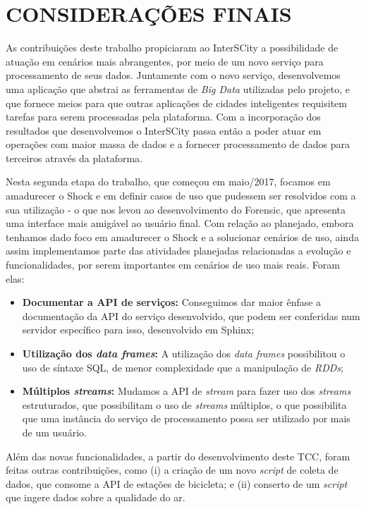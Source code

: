 \chapter{CONSIDERAÇÕES FINAIS}
\label{chapter:final}

As contribuições deste trabalho propiciaram ao InterSCity a possibilidade de
atuação em cenários mais abrangentes, por meio de um novo serviço
para processamento de seus dados. Juntamente com o novo serviço, desenvolvemos
uma aplicação que abstrai as ferramentas de \textit{Big Data} utilizadas pelo
projeto, e que fornece meios para que outras aplicações de cidades inteligentes
requisitem tarefas para serem processadas pela plataforma. Com a incorporação
dos resultados que desenvolvemos o InterSCity passa então a poder atuar em
operações com maior massa de dados e a fornecer processamento de dados para
terceiros através da plataforma.

Nesta segunda etapa do trabalho, que começou em maio/2017, focamos em
amadurecer o Shock e em definir casos de uso que pudessem ser resolvidos com
a sua utilização - o que nos levou ao desenvolvimento do Forensic, que apresenta
uma interface mais amigável ao usuário final. Com relação ao planejado, embora
tenhamos dado foco em amadurecer o Shock e a solucionar cenários de uso, ainda
assim implementamos parte das atividades planejadas relacionadas a evolução e
funcionalidades, por serem importantes em cenários de uso mais reais. Foram
elas:

\begin{itemize}
    \item \textbf{Documentar a API de serviços:} Conseguimos dar maior ênfase a
        documentação da API do serviço desenvolvido, que podem ser conferidas
        num servidor específico para isso, desenvolvido em Sphinx;
    \item \textbf{Utilização dos \textit{data frames}:} A utilização dos
        \textit{data frames} possibilitou o uso de síntaxe SQL, de menor
        complexidade que a manipulação de \textit{RDDs};
    \item \textbf{Múltiplos \textit{streams}:} Mudamos a API de \textit{stream}
        para fazer uso dos \textit{streams} estruturados, que possibilitam o
        uso de \textit{streams} múltiplos, o que possibilita que uma instância
        do serviço de processamento possa ser utilizado por mais de um usuário.
\end{itemize}

Além das novas funcionalidades, a partir do desenvolvimento deste TCC, foram
feitas outras contribuições, como (i) a criação de um novo \textit{script} de
coleta de dados, que consome a API de estações de bicicleta; e (ii) conserto
de um \textit{script} que ingere dados sobre a qualidade do ar.
